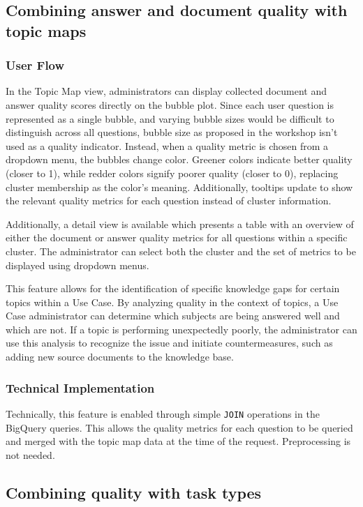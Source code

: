 \documentclass[
	english,
	ruledheaders=section,%
	class=report,%
	thesis={type=bachelor},%
	accentcolor=1b,%
	custommargins=true,%
	marginpar=false,%
	parskip=half-,%
	fontsize=11pt,%
	DIV=14,
]{tudapub}
\begin{document}
\subsection{Combining answer and document quality with topic maps}
\subsubsection{User Flow}
In the Topic Map view, administrators can display collected document and answer quality scores directly on the bubble plot. Since each user question is represented as a single bubble, and varying bubble sizes would be difficult to distinguish across all questions, bubble size as proposed in the workshop isn't used as a quality indicator. Instead, when a quality metric is chosen from a dropdown menu, the bubbles change color. Greener colors indicate better quality (closer to 1), while redder colors signify poorer quality (closer to 0), replacing cluster membership as the color's meaning. Additionally, tooltips update to show the relevant quality metrics for each question instead of cluster information.

Additionally, a detail view is available which presents a table with an overview of either the document or answer quality metrics for all questions within a specific cluster. The administrator can select both the cluster and the set of metrics to be displayed using dropdown menus.

This feature allows for the identification of specific knowledge gaps for certain topics within a Use Case. By analyzing quality in the context of topics, a Use Case administrator can determine which subjects are being answered well and which are not. If a topic is performing unexpectedly poorly, the administrator can use this analysis to recognize the issue and initiate countermeasures, such as adding new source documents to the knowledge base.

\subsubsection{Technical Implementation}
Technically, this feature is enabled through simple \texttt{JOIN} operations in the BigQuery queries. This allows the quality metrics for each question to be queried and merged with the topic map data at the time of the request. Preprocessing is not needed.
\subsection{Combining quality with task types}
\end{document}
